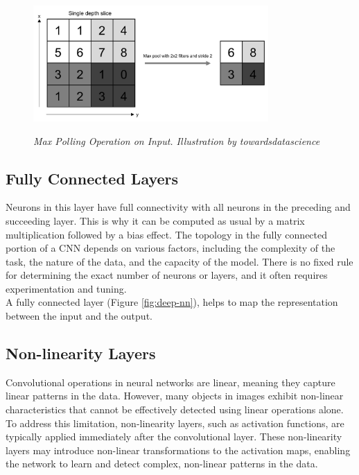 \begin{figure}[H]
  \centering
  \includegraphics[width=0.8\textwidth]{imatges/preliminaries/polling-layer.png}
  \caption[Max Polling Operation on Input]{\textit{Max Polling Operation on Input. Illustration by towardsdatascience}}
  {\label{fig:pooling-layer}}
\end{figure}

\subsection{Fully Connected Layers}

Neurons in this layer have full connectivity with all neurons in the preceding
and succeeding layer. This is why it can be computed as usual by a matrix
multiplication followed by a bias effect. The topology in the fully connected
portion of a CNN depends on various factors, including the complexity of the
task, the nature of the data, and the capacity of the model. There is no fixed
rule for determining the exact number of neurons or layers, and it often
requires experimentation and tuning. \\

A fully connected layer (Figure \ref{fig:deep-nn}), helps to map the
representation between the input and the output.

\subsection{Non-linearity Layers}

Convolutional operations in neural networks are linear, meaning they capture
linear patterns in the data. However, many objects in images exhibit non-linear
characteristics that cannot be effectively detected using linear operations
alone. To address this limitation, non-linearity layers, such as activation
functions, are typically applied immediately after the convolutional layer.
These non-linearity layers may introduce non-linear transformations to the
activation maps, enabling the network to learn and detect complex, non-linear
patterns in the data. \\

